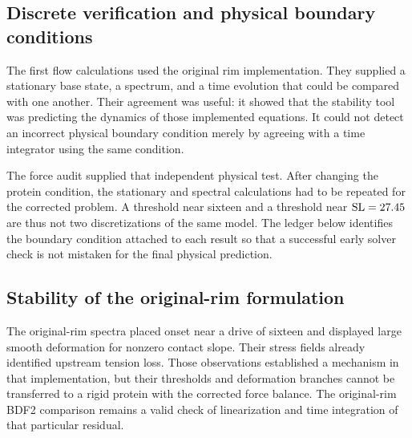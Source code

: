 \subsection{Discrete verification and physical boundary conditions}
The first flow calculations used the original rim implementation. They supplied a stationary base state, a spectrum, and a time evolution that could be compared with one another. Their agreement was useful: it showed that the stability tool was predicting the dynamics of those implemented equations. It could not detect an incorrect physical boundary condition merely by agreeing with a time integrator using the same condition.

The force audit supplied that independent physical test. After changing the protein condition, the stationary and spectral calculations had to be repeated for the corrected problem. A threshold near sixteen and a threshold near $\mathrm{SL}=27.45$ are thus not two discretizations of the same model. The ledger below identifies the boundary condition attached to each result so that a successful early solver check is not mistaken for the final physical prediction.


\subsection{Stability of the original-rim formulation}


The original-rim spectra placed onset near a drive of sixteen and displayed large smooth deformation for nonzero contact slope. Their stress fields already identified upstream tension loss. Those observations established a mechanism in that implementation, but their thresholds and deformation branches cannot be transferred to a rigid protein with the corrected force balance. The original-rim BDF2 comparison remains a valid check of linearization and time integration of that particular residual.






